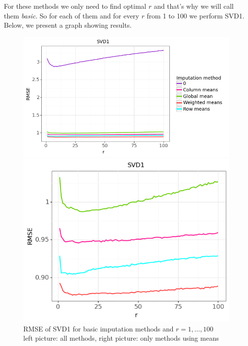 \documentclass[10pt]{amsart}
\begin{document}
For these methods we only need to find optimal $r$ and that's why we will call them \textit{basic}.
So for each of them and for every $r$ from 1 to 100 we perform SVD1.
Below, we present a graph showing results.



\begin{figure}[H]
\centering
\begin{minipage}{.63\textwidth}
  \centering
  \includegraphics[width=\textwidth]{svd1_1}
\end{minipage}%
\begin{minipage}{.4\textwidth}
  \centering
  \includegraphics[width=\textwidth]{svd1_2}
\end{minipage}
\caption{RMSE of SVD1 for basic imputation methods and $r = 1, \dots, 100$ \\
left picture: all methods, right picture: only methods using means}
\end{figure}
\end{document}
